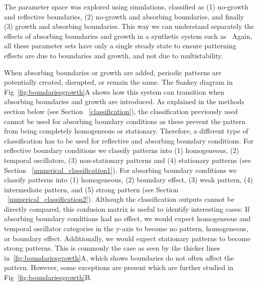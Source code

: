 The parameter space was explored using simulations, classified as  (1) no-growth and reflective boundaries, (2) no-growth and absorbing boundaries, and finally (3) growth and absorbing boundaries. This way we can understand separately the effects of absorbing boundaries and growth in a synthetic system such as~\parencite{Oliver2023}
Again, all these parameter sets have only a single steady state to ensure patterning effects are due to boundaries and growth, and not due to multistability.

When absorbing boundaries or growth are added, periodic patterns are potentially created, disrupted, or remain the same. The Sankey diagram in Fig~\ref{fig:boundariesgrowth}A shows how this system can transition when absorbing boundaries and growth are introduced.
As explained in the methods section below (see Section ~\ref{classification}), the classification previously used cannot be used for absorbing boundary conditions as these prevent the pattern from being completely homogeneous or stationary.  %
Therefore, a different type of classification has to be used for reflective and absorbing boundary conditions. For reflective boundary conditions we classify patterns into (1) homogeneous, (2) temporal oscillators, (3) non-stationary patterns and (4) stationary patterns (see Section ~\ref{numerical_classification1}). For absorbing boundary conditions we classify patterns into (1) homogeneous, (2) boundary effect, (3) weak pattern, (4) intermediate pattern, and (5) strong pattern (see Section ~\ref{numerical_classification2}).
Although the classification outputs cannot be directly compared, this confusion matrix is useful to identify interesting cases:
If absorbing boundary conditions had no effect, we would expect homogeneous and temporal oscillator categories in the y-axis to become no pattern, homogeneous, or boundary effect.
Additionally, we would expect stationary patterns to become strong patterns.
This is commonly the case as seen by the thicker lines in~\ref{fig:boundariesgrowth}A, which shows boundaries do not often affect the pattern.
However, some exceptions are present which are further studied in Fig~\ref{fig:boundariesgrowth}B.

